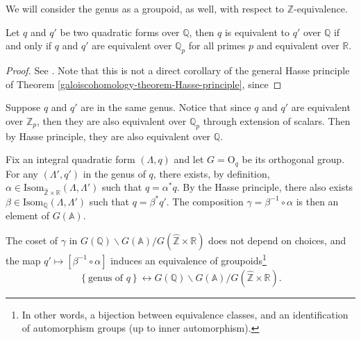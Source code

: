We will consider the genus as a groupoid, as well, with respect to $\mathbb Z$-equivalence.

\begin{theorem}
\label{theorem-Hasse-principle}
	Let $q$ and $q'$ be two quadratic forms over $\mathbb{Q}$, then $q$ is equivalent to $q'$ over $\mathbb{Q}$ if and only if $q$ and $q'$ are equivalent over $\mathbb{Q}_p$ for all primes $p$ and equivalent over $\mathbb{R}$.  
\end{theorem}
\begin{proof}
	See \cite[p.44]{Serre-arithmetic}. Note that this is not a direct corollary of the general Hasse principle of Theorem \ref{galoiscohomology-theorem-Hasse-principle}, since 
\end{proof}

\begin{remark}
\label{remark-genus-equivalent}
	Suppose $q$ and  $q'$ are in the same genus. Notice that since $q$ and  $q'$ are equivalent over $\mathbb{Z}_p$, then they are also equivalent over $\mathbb{Q}_p$ through extension of scalars. Then by Hasse principle, they are also equivalent over $\mathbb{Q}$. 
\end{remark}

\begin{proposition}
\label{proposition-bijection}
	Fix an integral quadratic form $(\Lambda,q)$ and let $G=\text{O}_q$ be its orthogonal group. For any $(\Lambda',q')$ in the genus of $q$, there exists, by definition, $\alpha\in \text{Isom}_{\hat{\mathbb{Z}}\times\mathbb{R}} (\Lambda, \Lambda')$ such that $q=\alpha^* q$. By the Hasse principle, there also exists $\beta\in \text{Isom}_{\mathbb Q} (\Lambda, \Lambda')$ such that $q=\beta^* q'$. The composition $\gamma = \beta^{-1}\circ \alpha$ is then an element of $G(\mathbb{A})$. 
	
	The coset of $\gamma$ in $G(\mathbb{Q})\backslash G(\mathbb{A})/G(\hat{\mathbb{Z}}\times \mathbb{R})$ does not depend on choices, and the map $q'\mapsto [\beta^{-1}\circ \alpha]$ induces an equivalence of groupoids\footnote{In other words, a bijection between equivalence classes, and an identification of automorphism groups (up to inner automorphism).}
    \begin{equation}\label{equation-bijection}
	    \left \{\text{genus of }q\right \} \longleftrightarrow G(\mathbb{Q})\backslash G(\mathbb{A})/G(\hat{\mathbb{Z}}\times \mathbb{R}).
    \end{equation}
\end{proposition}

